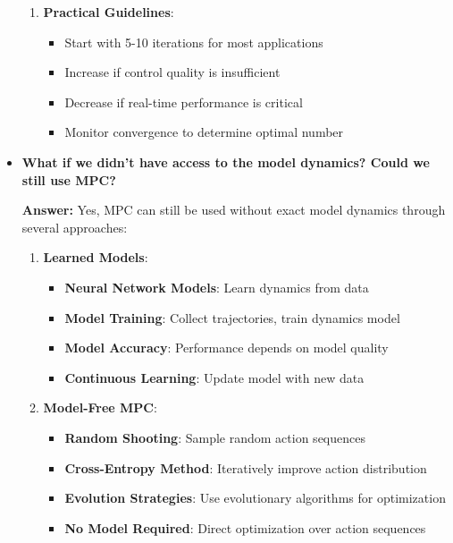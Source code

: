 \begin{itemize}
\begin{enumerate}
        \item \textbf{Practical Guidelines}:
        \begin{itemize}
            \item Start with 5-10 iterations for most applications
            \item Increase if control quality is insufficient
            \item Decrease if real-time performance is critical
            \item Monitor convergence to determine optimal number
        \end{itemize}
    \end{enumerate}
    
    \item \textbf{What if we didn't have access to the model dynamics? Could we still use MPC?}
    
    \textbf{Answer:} Yes, MPC can still be used without exact model dynamics through several approaches:
    
    \begin{enumerate}
        \item \textbf{Learned Models}:
        \begin{itemize}
            \item \textbf{Neural Network Models}: Learn dynamics from data
            \item \textbf{Model Training}: Collect trajectories, train dynamics model
            \item \textbf{Model Accuracy}: Performance depends on model quality
            \item \textbf{Continuous Learning}: Update model with new data
        \end{itemize}
        
        \item \textbf{Model-Free MPC}:
        \begin{itemize}
            \item \textbf{Random Shooting}: Sample random action sequences
            \item \textbf{Cross-Entropy Method}: Iteratively improve action distribution
            \item \textbf{Evolution Strategies}: Use evolutionary algorithms for optimization
            \item \textbf{No Model Required}: Direct optimization over action sequences
        \end{itemize}
        

\end{enumerate}
\end{itemize}
